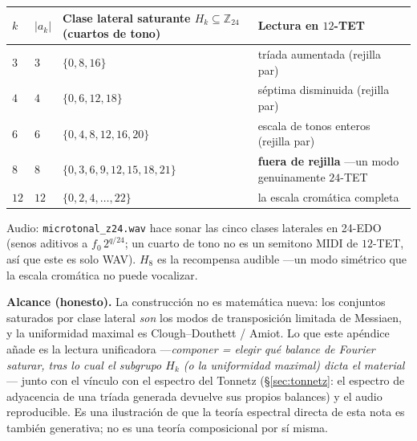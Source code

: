 \documentclass[11pt]{article}
\newcommand{\lean}[1]{\texttt{#1}}
\newcommand{\Zn}[1]{\mathbb{Z}_{#1}}
\begin{document}
\begin{table}[h]\centering\footnotesize\setlength{\tabcolsep}{5pt}
\begin{tabular}{@{}p{} p{} p{} p{}@{}}
\toprule
\rowcolor{ctB!22}
\textbf{$k$} & \textbf{$|a_k|$} & \textbf{Clase lateral saturante $H_k\subseteq\Zn{24}$ (cuartos de tono)} & \textbf{Lectura en $12$-TET}\\
\midrule
$3$  & $3$  & $\{0,8,16\}$ & tr\'iada aumentada (rejilla par)\\
$4$  & $4$  & $\{0,6,12,18\}$ & s\'eptima disminuida (rejilla par)\\
$6$  & $6$  & $\{0,4,8,12,16,20\}$ & escala de tonos enteros (rejilla par)\\
$8$  & $8$  & $\{0,3,6,9,12,15,18,21\}$ & \textbf{fuera de rejilla} ---un modo genuinamente $24$-TET\\
$12$ & $12$ & $\{0,2,4,\dots,22\}$ & la escala crom\'atica completa\\
\bottomrule
\end{tabular}
\end{table}

\noindent Audio: \lean{microtonal\_z24.wav} hace sonar las cinco clases laterales en 24-EDO (senos aditivos a
$f_0\,2^{q/24}$; un cuarto de tono no es un semitono MIDI de $12$-TET, as\'i que este es solo WAV). $H_8$ es la
recompensa audible ---un modo sim\'etrico que la escala crom\'atica no puede vocalizar.

\textbf{Alcance (honesto).} La construcci\'on no es matem\'atica nueva: los conjuntos saturados por clase
lateral \emph{son} los modos de transposici\'on limitada de Messiaen, y la uniformidad maximal es
Clough--Douthett / Amiot. Lo que este ap\'endice a\~nade es la lectura unificadora ---\emph{componer =
elegir qu\'e balance de Fourier saturar, tras lo cual el subgrupo $H_k$ (o la uniformidad maximal) dicta el
material}--- junto con el v\'inculo con el espectro del Tonnetz (\S\ref{sec:tonnetz}: el espectro de
adyacencia de una tr\'iada generada devuelve sus propios balances) y el audio reproducible. Es una
ilustraci\'on de que la teor\'ia espectral directa de esta nota es tambi\'en generativa; no es una teor\'ia
composicional por s\'i misma.
\end{document}
